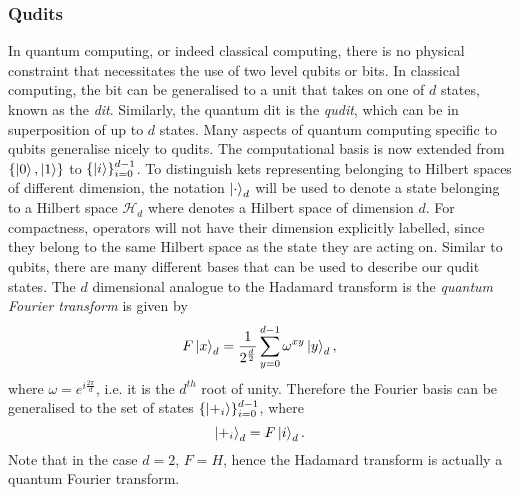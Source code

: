 \subsubsection{Qudits}
\label{subsubsection:qudits}
In quantum computing, or indeed classical computing, there is no physical constraint that necessitates the use of two level qubits or bits.
In classical computing, the bit can be generalised to a unit that takes on one of $d$ states, known as the \emph{dit}.
Similarly, the quantum dit is the \emph{qudit}, which can be in superposition of up to $d$ states.
Many aspects of quantum computing specific to qubits generalise nicely to qudits.
The computational basis is now extended from $\{\ket{0}, \ket{1}\}$ to $\{\ket{i}\}_{i=0}^{d-1}$.
To distinguish kets representing belonging to Hilbert spaces of different dimension, the notation $\ket{\cdot}_d$ will be used to denote a state belonging to a Hilbert space $\mathcal{H}_d$ where denotes a Hilbert space of dimension $d$.
For compactness, operators will not have their dimension explicitly labelled, since they belong to the same Hilbert space as the state they are acting on.
Similar to qubits, there are many different bases that can be used to describe our qudit states.
The $d$ dimensional analogue to the Hadamard transform is the \emph{quantum Fourier transform} is given by
\begin{equation}
    F\ket{x}_d = \frac{1}{2^{\frac{d}{2}}} \sum_{y=0}^{d-1} \omega^{xy}\ket{y}_d,
\end{equation}
where $\omega = e^{i\frac{2\pi}{d}}$, i.e. it is the $d^{th}$ root of unity.
Therefore the Fourier basis can be generalised to the set of states  $\{\ket{+_i}\}_{i=0}^{d-1}$, where
\begin{equation}
    \ket{+_i}_d = F\ket{i}_d.
\end{equation}
Note that in the case $d=2$, $F = H$, hence the Hadamard transform is actually a quantum Fourier transform.\newline

